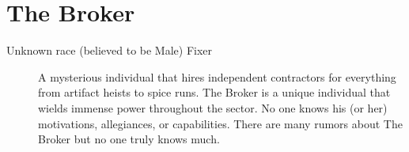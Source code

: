 \documentclass{article}
\begin{document}
\section{The Broker}
\begin{description}
	\item [Unknown race (believed to be Male) Fixer] A mysterious individual that hires independent contractors for everything from artifact heists to spice runs. The Broker is a unique individual that wields immense power throughout the sector. No one knows his (or her) motivations, allegiances, or capabilities. There are many rumors about The Broker but no one truly knows much.
\end{description}
\end{document}
